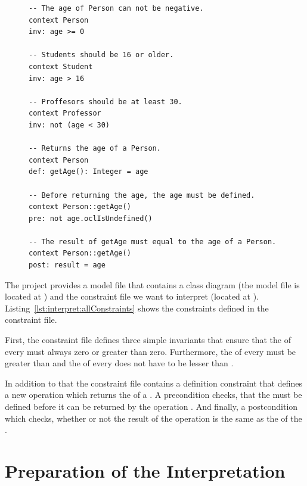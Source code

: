 \begin{figure}[!t]
  \lstset{
    language=OCL
  }
  \begin{lstlisting}[caption={The Constraints contained in the Constraint File.}, captionpos=b, label=lst:interpret:allConstraints]
-- The age of Person can not be negative.
context Person
inv: age >= 0

-- Students should be 16 or older.
context Student
inv: age > 16

-- Proffesors should be at least 30.
context Professor
inv: not (age < 30)

-- Returns the age of a Person.
context Person
def: getAge(): Integer = age

-- Before returning the age, the age must be defined.
context Person::getAge()
pre: not age.oclIsUndefined()

-- The result of getAge must equal to the age of a Person.
context Person::getAge()
post: result = age
  \end{lstlisting}
\end{figure}

The project provides a model file that contains a class diagram (the model file 
is located at ) and the constraint file we want to
interpret (located at 
). 
Listing~\ref{lst:interpret:allConstraints} shows the constraints defined in the
constraint file.

First, the constraint file defines three simple invariants that ensure that 
the  of every  must always zero or greater than zero. 
Furthermore, the  of every  must be greater than
 and the  of every  does not have to be
lesser than .

In addition to that the constraint file contains a definition constraint that 
defines a new operation  which returns the  of a 
. A precondition checks, that the  must be defined 
before it can be returned by the operation . And finally, a 
postcondition which checks, whether or not the result of the operation 
 is the same as the  of the .



\section{Preparation of the Interpretation}

